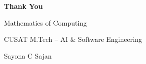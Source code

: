 \documentclass[aspectratio=169,11pt]{beamer}
\begin{document}

{
\begin{frame}
\centering
\vspace{1.5cm}

{\Huge\bfseries Thank You}

\vspace{0.5cm}

{\Large Mathematics of Computing}

\vspace{0.4cm}

{\large CUSAT M.Tech -- AI \& Software Engineering}

\vspace{0.8cm}

{\large Sayona C Sajan}

\end{frame}
}
\end{document}
